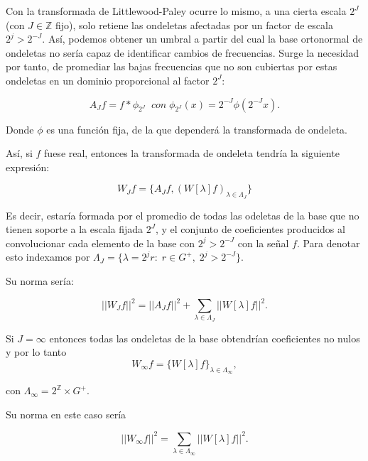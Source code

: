 \medskip

\noindent Con la transformada de Littlewood-Paley ocurre lo mismo, a una cierta escala $2^J$ (con $J \in \mathbb{Z}$ fijo), solo retiene las ondeletas afectadas por un factor de escala $2^j > 2^{-J}$. Así, podemos obtener un umbral a partir del cual la base ortonormal de ondeletas no sería capaz de identificar cambios de frecuencias. Surge la necesidad por tanto, de promediar las bajas frecuencias que no son cubiertas por estas ondeletas en un dominio proporcional al factor $2^J$:

\begin{equation}
  A_Jf=f \ast \phi_ {2^J} \; \; con \; \phi_ {2^J}(x)=2^{-J} \phi(2^{-J}x).
\end{equation}

\medskip

\noindent Donde $\phi$ es una función fija, de la que dependerá la transformada de ondeleta.

\medskip

\noindent Así, si $f$ fuese real, entonces la transformada de ondeleta tendría la siguiente expresión: 

$$W_J f=\lbrace A_Jf,(W[\lambda]f)_{\lambda \in \Lambda_J} \rbrace$$ 

\noindent Es decir, estaría formada por el promedio de todas las odeletas de la base que no tienen soporte a la escala fijada $2^J$, y el conjunto de coeficientes producidos al convolucionar cada elemento de la base con $2^j>2^{-J}$ con la señal $f$. Para denotar esto indexamos por $\Lambda_J=\lbrace \lambda=2^jr:\;r\in G^{+}, \; 2^j>2^{-J}\rbrace$. 

\medskip

\noindent Su norma sería: 

\begin{equation} \label{eq::norma}
  ||W_Jf||^2=||A_Jf||^2+\sum_{\lambda \in \Lambda_J} ||W[\lambda]f||^2.
\end{equation}

\medskip
 
\noindent Si $J=\infty$ entonces todas las ondeletas de la base obtendrían coeficientes no nulos y por lo tanto 
$$W_\infty f=\lbrace W[\lambda]f\rbrace_{\lambda \in \Lambda_\infty},$$ 

\noindent con $\Lambda_\infty=2^\mathbb{Z} \times G^{+}$. 

\noindent Su norma en este caso sería 

$$||W_\infty f||^2=\sum_{\lambda \in \Lambda_\infty} ||W[\lambda]f||^2.$$

